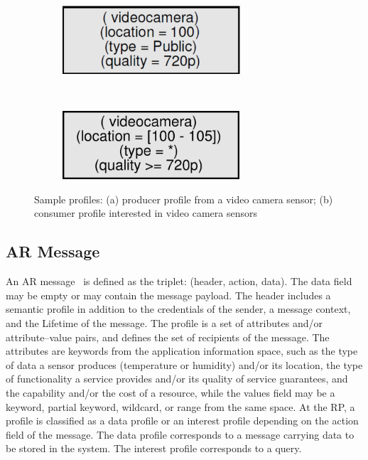 \begin{figure}
    \centering
    \begin{subfigure}[t]{0.5\textwidth}
        \centering
        \includegraphics[height=1in]{Figures/data_profile.pdf}
        \caption{}
        \label{fig:data_profile}
    \end{subfigure}%
    ~ 
    \begin{subfigure}[t]{0.5\textwidth}
        \centering
        \includegraphics[height=1in]{Figures/interest_profile.pdf}
        \caption{}
        \label{fig:interest_profile}
    \end{subfigure}
    \caption{Sample profiles: (a) producer profile from a video camera sensor; (b) consumer profile interested in video camera sensors}\label{fig:samples_profiles}
\end{figure}

\subsection{AR Message}
An AR message~\cite{meteor2008} is defined as the triplet: (header, action, data). The data field may be empty or may contain the message payload. The header includes a semantic profile in addition to the credentials of the sender, a message context, and the Lifetime of the message. The profile is a set of attributes and/or attribute–value pairs, and defines the set of recipients of the message. The attributes are keywords from the application information space, such as the type of data a sensor produces (temperature or humidity) and/or its location, the type of functionality a service provides and/or its quality of service guarantees, and the capability and/or the cost of a resource, while the values field may be a keyword, partial keyword, wildcard, or range from the same space. At the RP, a profile is classified as a data profile or an interest profile depending on the action field of the message. The data profile corresponds to a message carrying data to be stored in the system. The interest profile corresponds to a query.

